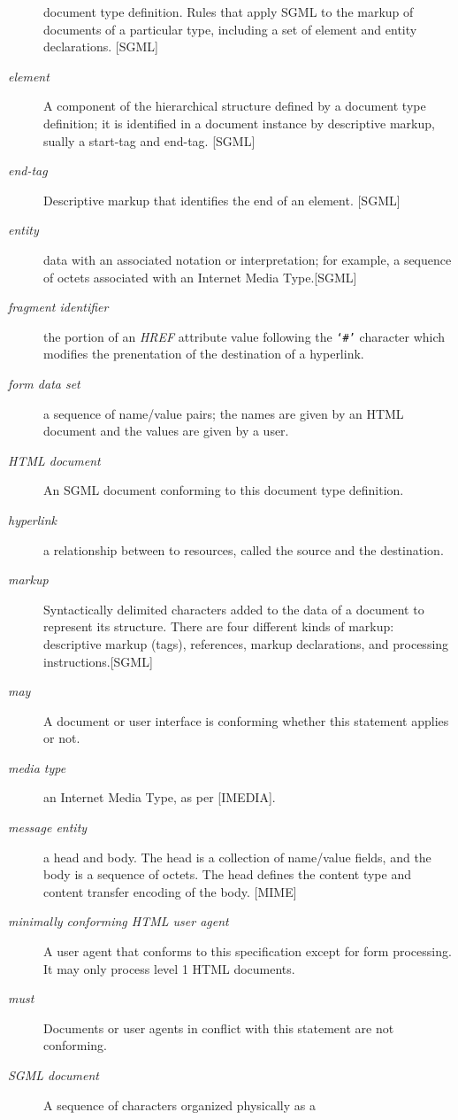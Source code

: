 \begin{description}
document type definition.  Rules that apply SGML to the
markup of documents of a particular type, including a set of element
and entity declarations.  [SGML]
\item[{\it element}]
A component of the hierarchical structure defined by a document type definition;  it is identified in a document instance by descriptive markup, sually a start-tag and end-tag.  [SGML]
\item[{\it end-tag}]
Descriptive markup that identifies the end of an
element.  [SGML]
\item[{\it entity}]
data with an associated notation or interpretation;  for
example, a sequence of octets associated with an Internet Media
Type.[SGML]
\item[{\it fragment identifier}]
the portion of an {\it HREF} attribute
value following the {\tt `\#'} character which modifies the prenentation
of the destination of a hyperlink.
\item[{\it form data set}]
a sequence of name/value pairs;  the names are
given by an HTML document and the values are given by a user.
\item[{\it HTML document}]
An SGML document conforming to this document type
definition.
\item[{\it hyperlink}]
a relationship between to resources, called the source
and the destination.
\item[{\it markup}]
Syntactically delimited characters added to the data of a
document to represent its structure.  There are four different kinds of
markup:  descriptive markup (tags), references, markup declarations,
and processing instructions.[SGML]
\item[{\it may}]
A document or user interface is conforming whether this
statement applies or not.
\item[{\it media type}]
an Internet Media Type, as per [IMEDIA].
\item[{\it message entity}]
a head and body.  The head is a collection of
name/value fields, and the body is a sequence of octets.  The head
defines the content type and content transfer encoding of the body.  [MIME]
\item[{\it minimally conforming HTML user agent}]
A user agent that conforms
to this specification except for form processing.  It may only process
level 1 HTML documents.
\item[{\it must}]
Documents or user agents in conflict with this statement
are not conforming.
\item[{\it SGML document}]
A sequence of characters organized physically as a

\end{description}
